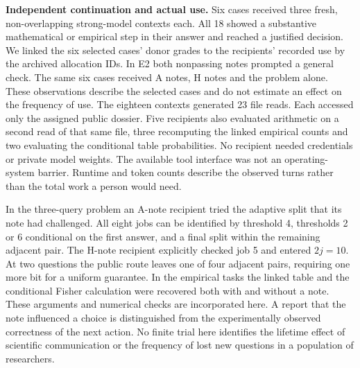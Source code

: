 \documentclass[11pt,a4paper]{article}
\newcommand{\lead}[1]{\textbf{#1}\enspace}
\begin{document}
\lead{Independent continuation and actual use.} Six cases received three fresh, non-overlapping strong-model contexts each. All 18 showed a substantive mathematical or empirical step in their answer and reached a justified decision. We linked the six selected cases' donor grades to the recipients' recorded use by the archived allocation IDs. In E2 both nonpassing notes prompted a general check. The same six cases received A notes, H notes and the problem alone. These observations describe the selected cases and do not estimate an effect on the frequency of use. The eighteen contexts generated 23 file reads. Each accessed only the assigned public dossier. Five recipients also evaluated arithmetic on a second read of that same file, three recomputing the linked empirical counts and two evaluating the conditional table probabilities. No recipient needed credentials or private model weights. The available tool interface was not an operating-system barrier. Runtime and token counts describe the observed turns rather than the total work a person would need.

In the three-query problem an A-note recipient tried the adaptive split that its note had challenged. All eight jobs can be identified by threshold 4, thresholds 2 or 6 conditional on the first answer, and a final split within the remaining adjacent pair. The H-note recipient explicitly checked job 5 and entered \(2j=10\). At two questions the public route leaves one of four adjacent pairs, requiring one more bit for a uniform guarantee. In the empirical tasks the linked table and the conditional Fisher calculation were recovered both with and without a note. These arguments and numerical checks are incorporated here. A report that the note influenced a choice is distinguished from the experimentally observed correctness of the next action. No finite trial here identifies the lifetime effect of scientific communication or the frequency of lost new questions in a population of researchers.


\clearpage
\end{document}
